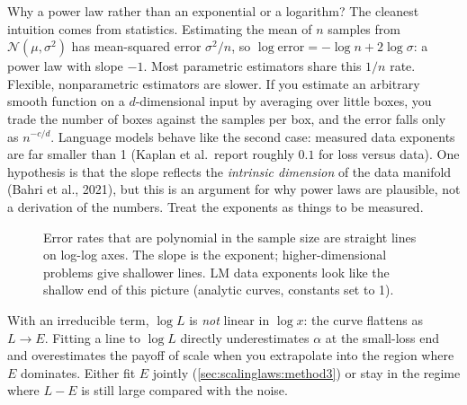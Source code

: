Why a power law rather than an exponential or a logarithm? The cleanest intuition comes from
statistics. Estimating the mean of $n$ samples from $\mathcal N(\mu,\sigma^2)$ has
mean-squared error $\sigma^2/n$, so $\log\text{error} = -\log n + 2\log\sigma$: a power law with
slope $-1$. Most parametric estimators share this $1/n$ rate. Flexible, nonparametric
estimators are slower. If you estimate an arbitrary smooth function on a $d$-dimensional
input by averaging over little boxes, you trade the number of boxes against the samples per box,
and the error falls only as $n^{-c/d}$. Language models behave like the second case: measured
data exponents are far smaller than 1 (Kaplan et al.\ report roughly $0.1$ for loss versus
data). One hypothesis is that the slope reflects the \emph{intrinsic dimension} of the data
manifold (Bahri et al., 2021), but this is an argument for why power laws are plausible, not a
derivation of the numbers. Treat the exponents as things to be measured.

\begin{figure}[t]
\centering
{}
\caption{Error rates that are polynomial in the sample size are straight lines on log-log axes.
The slope is the exponent; higher-dimensional problems give shallower lines. LM data
exponents look like the shallow end of this picture (analytic curves, constants set to 1).}
\label{fig:scalinglaws:rates}
\end{figure}

\begin{pitfall}
With an irreducible term, $\log L$ is \emph{not} linear in $\log x$: the curve flattens as
$L\to E$. Fitting a line to $\log L$ directly underestimates $\alpha$ at the small-loss end and
overestimates the payoff of scale when you extrapolate into the region where $E$ dominates.
Either fit $E$ jointly (\cref{sec:scalinglaws:method3}) or stay in the regime where $L-E$ is
still large compared with the noise.
\end{pitfall}

